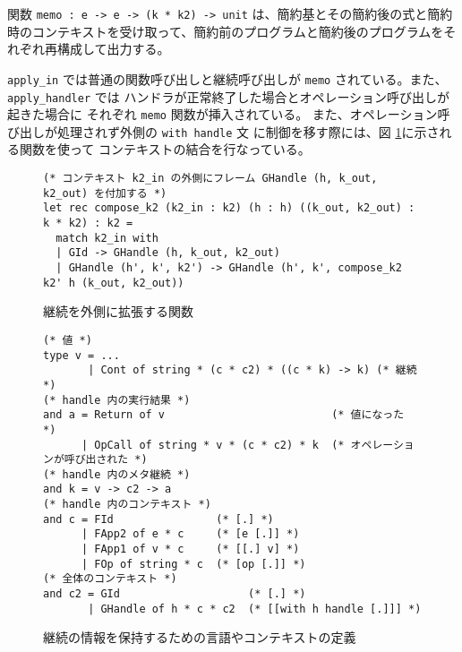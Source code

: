 関数 \texttt{memo :\ e -> e -> (k * k2) -> unit} は、簡約基とその簡約後の式と簡約時のコンテキストを受け取って、簡約前のプログラムと簡約後のプログラムをそれぞれ再構成して出力する。

\texttt{apply\_in} では普通の関数呼び出しと継続呼び出しが
\texttt{memo} されている。また、\texttt{apply\_handler} では
ハンドラが正常終了した場合とオペレーション呼び出しが起きた場合に
それぞれ \texttt{memo} 関数が挿入されている。
また、オペレーション呼び出しが処理されず外側の \texttt{with handle} 文
に制御を移す際には、図 \ref{figure:compose}に示される関数を使って
コンテキストの結合を行なっている。

\begin{figure}
\begin{verbatim}
(* コンテキスト k2_in の外側にフレーム GHandle (h, k_out, k2_out) を付加する *)
let rec compose_k2 (k2_in : k2) (h : h) ((k_out, k2_out) : k * k2) : k2 =
  match k2_in with
  | GId -> GHandle (h, k_out, k2_out)
  | GHandle (h', k', k2') -> GHandle (h', k', compose_k2 k2' h (k_out, k2_out))
\end{verbatim}
\caption{継続を外側に拡張する関数}
\label{figure:compose}
\end{figure}

\begin{figure}
\begin{verbatim}
(* 値 *)
type v = ...
       | Cont of string * (c * c2) * ((c * k) -> k) (* 継続 *)
(* handle 内の実行結果 *)
and a = Return of v                          (* 値になった *)
      | OpCall of string * v * (c * c2) * k  (* オペレーションが呼び出された *)
(* handle 内のメタ継続 *)
and k = v -> c2 -> a
(* handle 内のコンテキスト *)
and c = FId                (* [.] *)
      | FApp2 of e * c     (* [e [.]] *)
      | FApp1 of v * c     (* [[.] v] *)
      | FOp of string * c  (* [op [.]] *)
(* 全体のコンテキスト *)
and c2 = GId                    (* [.] *)
       | GHandle of h * c * c2  (* [[with h handle [.]]] *)
\end{verbatim}
\caption{継続の情報を保持するための言語やコンテキストの定義}
\label{figure:k_6cps}
\end{figure}


